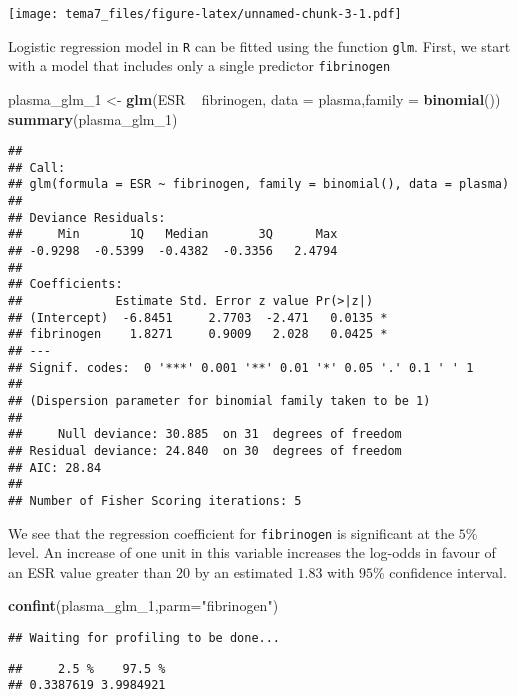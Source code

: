 \documentclass[]{article}
\newenvironment{Shaded}{\begin{snugshade}}{\end{snugshade}}
\newcommand{\KeywordTok}[1]{\textcolor[rgb]{0.13,0.29,0.53}{\textbf{{#1}}}}
\newcommand{\DataTypeTok}[1]{\textcolor[rgb]{0.13,0.29,0.53}{{#1}}}
\newcommand{\StringTok}[1]{\textcolor[rgb]{0.31,0.60,0.02}{{#1}}}
\newcommand{\NormalTok}[1]{{#1}}
\numberwithin{equation}{section}
\begin{document}
\texttt{[image: tema7\_files/figure-latex/unnamed-chunk-3-1.pdf]}

Logistic regression model in \texttt{R} can be fitted using the function
\texttt{glm}. First, we start with a model that includes only a single
predictor \texttt{fibrinogen}

\begin{Shaded}
\begin{Highlighting}[]
\NormalTok{plasma_glm_1 <-}\StringTok{ }\KeywordTok{glm}\NormalTok{(ESR ~}\StringTok{ }\NormalTok{fibrinogen, }\DataTypeTok{data =} \NormalTok{plasma,}\DataTypeTok{family =} \KeywordTok{binomial}\NormalTok{())}
\KeywordTok{summary}\NormalTok{(plasma_glm_1)}
\end{Highlighting}
\end{Shaded}

\begin{verbatim}
## 
## Call:
## glm(formula = ESR ~ fibrinogen, family = binomial(), data = plasma)
## 
## Deviance Residuals: 
##     Min       1Q   Median       3Q      Max  
## -0.9298  -0.5399  -0.4382  -0.3356   2.4794  
## 
## Coefficients:
##             Estimate Std. Error z value Pr(>|z|)  
## (Intercept)  -6.8451     2.7703  -2.471   0.0135 *
## fibrinogen    1.8271     0.9009   2.028   0.0425 *
## ---
## Signif. codes:  0 '***' 0.001 '**' 0.01 '*' 0.05 '.' 0.1 ' ' 1
## 
## (Dispersion parameter for binomial family taken to be 1)
## 
##     Null deviance: 30.885  on 31  degrees of freedom
## Residual deviance: 24.840  on 30  degrees of freedom
## AIC: 28.84
## 
## Number of Fisher Scoring iterations: 5
\end{verbatim}

We see that the regression coefficient for \texttt{fibrinogen} is
significant at the \(5\%\) level. An increase of one unit in this
variable increases the log-odds in favour of an ESR value greater than
20 by an estimated \(1.83\) with \(95\%\) confidence interval.

\begin{Shaded}
\begin{Highlighting}[]
\KeywordTok{confint}\NormalTok{(plasma_glm_1,}\DataTypeTok{parm=}\StringTok{"fibrinogen"}\NormalTok{)}
\end{Highlighting}
\end{Shaded}

\begin{verbatim}
## Waiting for profiling to be done...
\end{verbatim}

\begin{verbatim}
##     2.5 %    97.5 % 
## 0.3387619 3.9984921
\end{verbatim}
\end{document}
